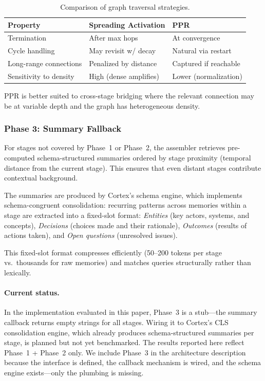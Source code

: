 \documentclass[11pt]{article}
\begin{document}
\begin{table}[h]
\centering
\caption{Comparison of graph traversal strategies.}
\label{tab:ppr-vs-bfs}
\small
\begin{tabular}{lll}
\toprule
Property & Spreading Activation & PPR \\
\midrule
Termination & After max hops & At convergence \\
Cycle handling & May revisit w/ decay & Natural via restart \\
Long-range connections & Penalized by distance & Captured if reachable \\
Sensitivity to density & High (dense amplifies) & Lower (normalization) \\
\bottomrule
\end{tabular}
\end{table}

PPR is better suited to cross-stage bridging where the relevant
connection may be at variable depth and the graph has heterogeneous
density.

\subsubsection{Phase 3: Summary Fallback}
\label{sec:phase3}

For stages not covered by Phase~1 or Phase~2, the assembler retrieves
pre-computed schema-structured summaries ordered by stage proximity
(temporal distance from the current stage).  This ensures that even
distant stages contribute contextual background.

The summaries are produced by Cortex's schema engine, which implements
\citet{Tse2007} schema-congruent consolidation: recurring patterns
across memories within a stage are extracted into a fixed-slot format:
\emph{Entities} (key actors, systems, and concepts),
\emph{Decisions} (choices made and their rationale),
\emph{Outcomes} (results of actions taken), and
\emph{Open questions} (unresolved issues).

This fixed-slot format compresses efficiently (50--200 tokens per
stage vs.\ thousands for raw memories) and matches queries
structurally rather than lexically.

\paragraph{Current status.}
In the implementation evaluated in this paper, Phase~3 is a stub---the
summary callback returns empty strings for all stages.  Wiring it to
Cortex's CLS consolidation engine, which already produces
schema-structured summaries per stage, is planned but not yet
benchmarked.  The results reported here reflect Phase~1 + Phase~2
only.  We include Phase~3 in the architecture description because the
interface is defined, the callback mechanism is wired, and the schema
engine exists---only the plumbing is missing.
\end{document}
